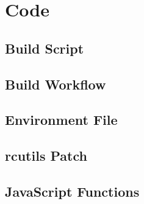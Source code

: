 \chapter{Code}

\section{Build Script}\label{sec:apxblasm}

    

    \pagebreak

\section{Build Workflow}\label{sec:apxworkflow}

    

    \pagebreak

\section{Environment File}\label{sec:apxenv}
    
    \pagebreak

\section{rcutils Patch}\label{sec:apxpatch}

    

    \pagebreak

\section{JavaScript Functions}\label{sec:apxmodule}

    

    \pagebreak


%         

